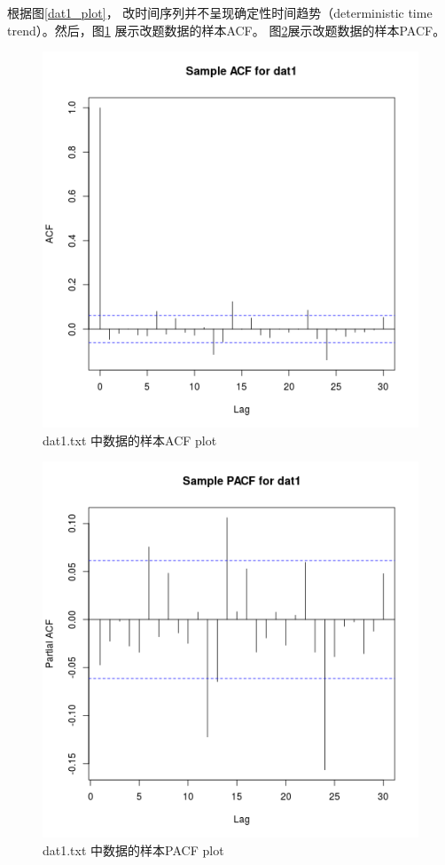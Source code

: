 \documentclass[11pt]{article}
\begin{document}
根据图\ref{dat1_plot}， 改时间序列并不呈现确定性时间趋势（deterministic time trend）。然后，图\ref{dat1_acf} 展示改题数据的样本ACF。 图\ref{dat1_pacf}展示改题数据的样本PACF。
\begin{figure}[h]
	\centering
	\includegraphics[scale=0.4]{dat1_acf.png}
	\caption{dat1.txt 中数据的样本ACF plot}
\label{dat1_acf}
\end{figure}
\begin{figure}[h]
	\centering
	\includegraphics[scale=0.4]{dat1_pacf.png}
	\caption{dat1.txt 中数据的样本PACF plot}
\label{dat1_pacf}
\end{figure}
\end{document}
